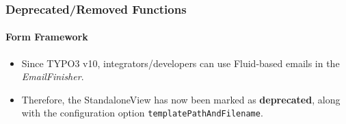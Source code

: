 %

\begin{frame}[fragile]
	\frametitle{Deprecated/Removed Functions}
	\framesubtitle{Form Framework}

	\begin{itemize}
		\item Since TYPO3 v10, integrators/developers can use Fluid-based emails
			in the \textit{EmailFinisher}.
		\item Therefore, the StandaloneView has now been marked as \textbf{deprecated},
			along with the configuration option \texttt{templatePathAndFilename}.
	\end{itemize}

\end{frame}

